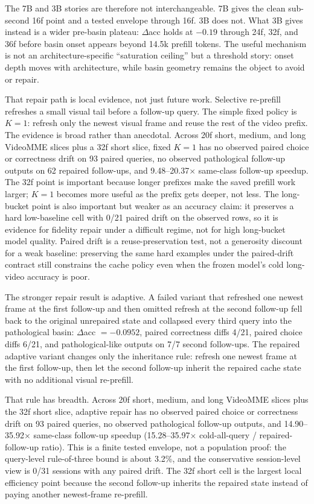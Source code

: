 The 7B and 3B stories are therefore not interchangeable. 7B gives the clean
sub-second 16f point and a tested envelope through 16f. 3B does not. What 3B
gives instead is a wider pre-basin plateau: $\Delta$acc holds at $-0.19$
through 24f, 32f, and 36f before basin onset appears beyond 14.5k prefill
tokens. The useful mechanism is not an architecture-specific ``saturation
ceiling'' but a threshold story: onset depth moves with architecture, while
basin geometry remains the object to avoid or repair.

That repair path is local evidence, not just future work. Selective
re-prefill refreshes a small visual tail before a follow-up query. The simple
fixed policy is \(K=1\): refresh only the newest visual frame and reuse the
rest of the video prefix. The evidence is broad rather than anecdotal. Across 20f
short, medium, and long VideoMME slices plus a 32f short slice, fixed \(K=1\)
has no observed paired choice or correctness drift on 93 paired queries, no
observed pathological follow-up outputs on 62 repaired follow-ups, and
9.48--20.37$\times$ same-class follow-up speedup. The 32f point is important
because longer prefixes make the saved prefill work larger; \(K=1\) becomes
more useful as the prefix gets deeper, not less. The long-bucket point is also
important but weaker as an accuracy claim: it preserves a hard low-baseline
cell with 0/21 paired drift on the observed rows, so it is evidence for fidelity
repair under a difficult regime, not for high long-bucket model quality.
Paired drift is a reuse-preservation test, not a generosity discount for a weak
baseline: preserving the same hard examples under the paired-drift contract still constrains the cache
policy even when the frozen model's cold long-video accuracy is poor.



The stronger repair result is adaptive. A failed variant that refreshed one
newest frame at the first follow-up and then omitted refresh at the second follow-up
fell back to the original unrepaired state and collapsed every
third query into the pathological basin: \(\Delta\)acc \(=-0.0952\), paired
correctness diffs 4/21, paired choice diffs 6/21, and pathological-like
outputs on 7/7 second follow-ups. The repaired adaptive variant changes only
the inheritance rule: refresh one newest frame at the first follow-up, then
let the second follow-up inherit the repaired cache state with no additional
visual re-prefill.

That rule has breadth. Across 20f short, medium, and long VideoMME slices
plus the 32f short slice, adaptive repair has no observed paired choice or
correctness drift on 93 paired queries, no observed pathological follow-up
outputs, and 14.90--35.92$\times$ same-class follow-up speedup
(15.28--35.97$\times$ cold-all-query / repaired-follow-up ratio). This is a
finite tested envelope, not a population proof: the query-level rule-of-three
bound is about 3.2\%, and the conservative session-level view is 0/31 sessions
with any paired drift. The 32f short cell is the largest local efficiency point
because the second follow-up inherits the repaired state instead of paying
another newest-frame re-prefill.

